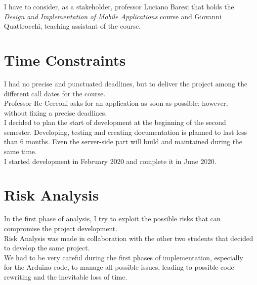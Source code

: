 I have to consider, as a stakeholder, professor Luciano Baresi that holds the \textit{Design and Implementation of Mobile Applications} course and Giovanni Quattrocchi, teaching assistant of the course.

\section{Time Constraints}
I had no precise and punctuated deadlines, but to deliver the project among the different call dates for the course.\\

Professor Re Cecconi asks for an application as soon as possible; however, without fixing a precise deadlines.\\

I decided to plan the start of development at the beginning of the second semester. Developing, testing and creating documentation is planned to last less than 6 months. Even the server-side part will build and maintained during the same time.\\

I started development in February 2020 and complete it in June 2020.

\section{Risk Analysis}
In the first phase of analysis, I try to exploit the possible risks that can compromise the project development.\\

Risk Analysis was made in collaboration with the other two students that decided to develop the same project.\\

We had to be very careful during the first phases of implementation, especially for the Arduino code, to manage all possible issues, leading to possible code rewriting and the inevitable loss of time.

